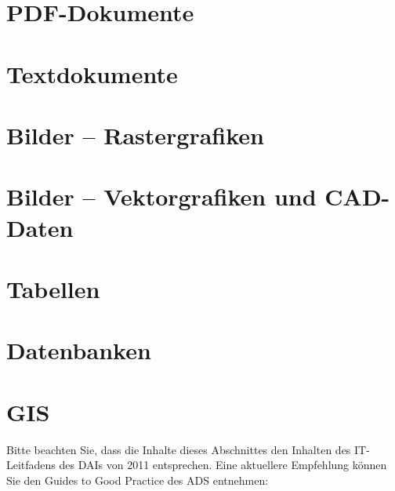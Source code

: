 \newpage
\section{PDF-Dokumente}
\label{pdf-dokumente}
	
	

\newpage		
\section{Textdokumente}\label{textdokumente}
		
	

\newpage
\section{Bilder -- Rastergrafiken}\label{rastergrafiken}
	
	

\newpage
\section{Bilder -- Vektorgrafiken und CAD-Daten}\label{vektorgrafiken}
	
	

\newpage	
\section{Tabellen}\label{tabellen}
	
	

\newpage
\section{Datenbanken}\label{Datenbanken}\label{datenbanken}
	
	

\newpage
\section{GIS}\label{GIS}
Bitte beachten Sie, dass die Inhalte dieses Abschnittes den Inhalten des IT-Leitfadens des DAIs von 2011 entsprechen. Eine aktuellere Empfehlung können Sie den Guides to Good Practice des ADS entnehmen: 
\begin{center}
\tib{\rule{0.9\textwidth}{0.2mm}}\vspace{3mm}
\end{center}

